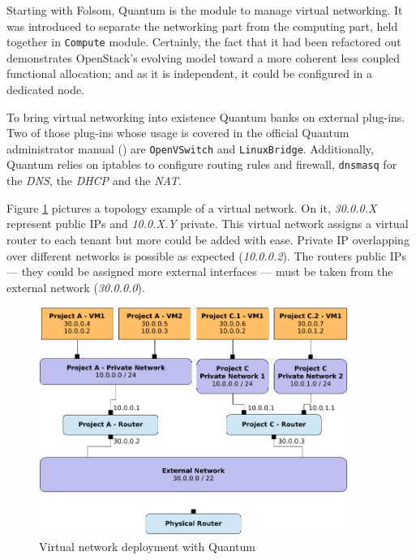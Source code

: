 \noindent Starting with Folsom, Quantum is the module to manage virtual networking. It was introduced to separate the networking part from the computing part, held together in \texttt{Compute} module. Certainly, the fact that it had been refactored out demonstrates OpenStack's evolving model toward a more coherent less coupled functional allocation; and as it is independent, it could be configured in a dedicated node.

To bring virtual networking into existence Quantum banks on external plug-ins. Two of those plug-ins whose usage is covered in the official Quantum administrator manual (\cite{quantumadminfolsom}) are \texttt{OpenVSwitch} and \texttt{LinuxBridge}. Additionally, Quantum relies on iptables to configure routing rules and firewall, \texttt{dnsmasq} for the \emph{DNS}, the \emph{DHCP} and the \emph{NAT}.

Figure \ref{fig:desplieguequantum} pictures a topology example of a virtual network. On it, \emph{30.0.0.X} represent public IPs and \emph{10.0.X.Y} private. This virtual network assigns a virtual router to each tenant but more could be added with ease. Private IP overlapping over different networks is possible as expected (\emph{10.0.0.2}). The routers public IPs --- they could be assigned more external interfaces --- must be taken from the external network (\emph{30.0.0.0}).

\begin{figure}[tbh]
\begin{center}
\includegraphics[width=0.9\textwidth]{imagenes/014.pdf}
 \caption{Virtual network deployment with Quantum}
\label{fig:desplieguequantum}
\end{center}
\end{figure}

